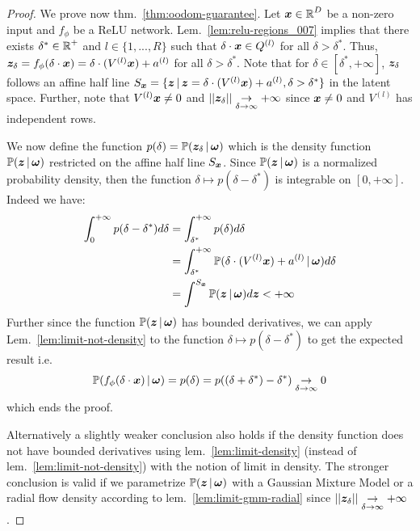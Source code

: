 \begin{proof}
We prove now thm.~\ref{thm:oodom-guarantee}. Let $\bm{x} \in \operatorname{\mathbb{R}}^D $ be a non-zero input and $f_{\phi}$ be a ReLU network. Lem.~\ref{lem:relu-regions_007} implies that there exists $\delta^* \in \operatorname{\mathbb{R}}^{+}$ and $l \in \{1,..., R\}$ such that $\delta \cdot \bm{x} \in Q^{(l)}$ for all $\delta > \delta^*$. Thus, $\bm{z}_{\delta} = f_{\phi}(\delta \cdot \bm{x}) = \delta \cdot (V^{(l)} \bm{x}) + a^{(l)}$ for all $\delta > \delta^*$. Note that for $\delta\in [\delta^*, +\infty]$,  $\bm{z}_{\delta}$ follows an affine half line $S_{\bm{x}} = \{\bm{z} \,|\, \bm{z} = \delta \cdot (V^{(l)} \bm{x}) + a^{(l)}, \delta > \delta^* \}$ in the latent space. Further, note that $V^{(l)}\bm{x} \neq 0$ and $|| \bm{z}_\delta|| \underset{\delta \rightarrow \infty}{\rightarrow} + \infty$ since $\bm{x} \neq 0$ and $V^{(l)}$ has independent rows.

We now define the function $p(\delta)=\mathbb{P}(\bm{z}_{\delta} \,|\, \bm{\omega})$ which is the density function $\mathbb{P}(\bm{z} \,|\, \bm{\omega})$ restricted on the affine half line $S_{\bm{x}}$. Since $\mathbb{P}(\bm{z} \,|\, \bm{\omega})$ is a normalized probability density, then the function $\delta \mapsto p(\delta - \delta^*)$ is integrable on $[0, +\infty]$. Indeed we have:
\begin{align*}
    \int_{0}^{+\infty} p(\delta - \delta^*) d\delta &= \int_{\delta^*}^{+\infty} p(\delta) d\delta \\
    &= \int_{\delta^*}^{+\infty} \mathbb{P}(\delta \cdot (V^{(l)} \bm{x}) + a^{(l)} \,|\, \bm{\omega}) d\delta\\
    &= \int^{S_{\bm{x}}} \mathbb{P}(\bm{z} \,|\, \bm{\omega}) d\bm{z} < +\infty
\end{align*}
Further since the function $\mathbb{P}(\bm{z} \,|\, \bm{\omega})$ has bounded derivatives, we can apply  Lem.~\ref{lem:limit-not-density} to the function $\delta \mapsto p(\delta - \delta^*)$ to get the expected result i.e.
\begin{align*}
    \mathbb{P}(f_{\phi}(\delta \cdot \bm{x}) \,|\, \bm{\omega}) = p(\delta) = p((\delta + \delta^*) - \delta^*) \underset{\delta \rightarrow \infty}{\rightarrow} 0
\end{align*}
which ends the proof.

Alternatively a slightly weaker conclusion also holds if the density function does not have bounded derivatives using lem.~\ref{lem:limit-density} (instead of lem.~\ref{lem:limit-not-density}) with the notion of limit in density. The stronger conclusion is valid if we parametrize $\mathbb{P}(\bm{z} \,|\, \bm{\omega})$ with a Gaussian Mixture Model or a radial flow density according to lem.~\ref{lem:limit-gmm-radial} since $|| \bm{z}_\delta|| \underset{\delta \rightarrow \infty}{\rightarrow} + \infty$.
\end{proof}

